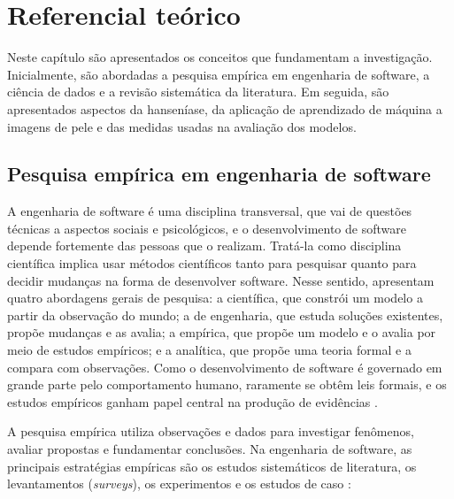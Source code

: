 \chapter{Referencial teórico}
\label{cap:referencial-teorico}

Neste capítulo são apresentados os conceitos que fundamentam a investigação.
Inicialmente, são abordadas a pesquisa empírica em engenharia de software,
a ciência de dados e a revisão sistemática da literatura. Em seguida, são
apresentados aspectos da hanseníase, da aplicação de aprendizado de máquina
a imagens de pele e das medidas usadas na avaliação dos modelos.

\section{Pesquisa empírica em engenharia de software}

A engenharia de software é uma disciplina transversal, que vai de questões
técnicas a aspectos sociais e psicológicos, e o desenvolvimento de software
depende fortemente das pessoas que o realizam. Tratá-la como disciplina
científica implica usar métodos científicos tanto para pesquisar quanto para
decidir mudanças na forma de desenvolver software. Nesse sentido,
 apresentam quatro abordagens gerais de pesquisa: a científica, que constrói um modelo a partir
da observação do mundo; a de engenharia, que estuda soluções existentes,
propõe mudanças e as avalia; a empírica, que propõe um modelo e o avalia por
meio de estudos empíricos; e a analítica, que propõe uma teoria formal e a
compara com observações. Como o desenvolvimento de software é governado em
grande parte pelo comportamento humano, raramente se obtêm leis formais, e os
estudos empíricos ganham papel central na produção de evidências
\cite{wohlin2024}.

A pesquisa empírica utiliza observações e dados para investigar fenômenos,
avaliar propostas e fundamentar conclusões. Na engenharia de software, as
principais estratégias empíricas são os estudos sistemáticos de literatura,
os levantamentos (\textit{surveys}), os experimentos e os estudos de caso
\cite{wohlin2024}:

